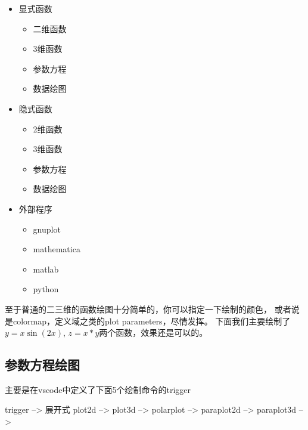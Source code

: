 \begin{framed}
\begin{multicols}{3}
    \begin{itemize}    
        \item 显式函数
            \begin{itemize}
                \item 二维函数
                \item 3维函数
                \item 参数方程
                \item 数据绘图
            \end{itemize}
        \item 隐式函数
        \begin{itemize}
            \item 2维函数
            \item 3维函数
            \item 参数方程
            \item 数据绘图
        \end{itemize} 
        \item 外部程序
        \begin{itemize}
            \item gnuplot 
            \item mathematica
            \item matlab
            \item python
        \end{itemize} 
\end{itemize} 
\end{multicols}
\end{framed}


\newcommand{\Note}[1]{\texttt{#1}}
至于普通的二三维的函数绘图十分简单的，你可以指定一下绘制的颜色，
或者说是colormap，定义域之类的plot parameters，尽情发挥。
下面我们主要绘制了 $y=x\sin(2x)$, $z=x*y$两个函数，效果还是可以的。

\nomargin
\begin{center}

\end{center}

\subsection{参数方程绘图}
主要是在vscode中定义了下面5个绘制命令的trigger
\begin{bytes}
trigger    --> 展开式
plot2d     --> 
plot3d     --> 
polarplot  --> 
paraplot2d --> 
paraplot3d --> 
\end{bytes}

